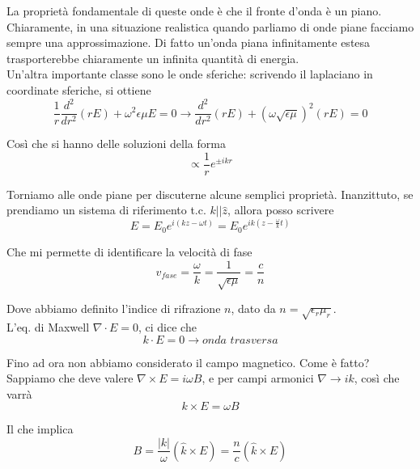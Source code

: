 \documentclass{report}
\begin{document}
La proprietà fondamentale di queste onde è che il fronte d'onda è un piano. Chiaramente, in una situazione realistica quando parliamo di onde piane facciamo sempre una approssimazione. Di fatto un'onda piana infinitamente estesa trasporterebbe chiaramente un infinita quantità di energia. \\

Un'altra importante classe sono le onde sferiche: scrivendo il laplaciano in coordinate sferiche, si ottiene 
\begin{equation}
    \frac{1}{r}\frac{d^2}{dr^2}\left(rE\right) + \omega^2\epsilon\mu E = 0 \rightarrow \frac{d^2}{dr^2}(rE) + (\omega \sqrt{\epsilon\mu})^2(rE) = 0
\end{equation}

Così che si hanno delle soluzioni della forma 
\begin{equation}
    \propto \frac{1}{r}e^{\pm ikr}
\end{equation}

Torniamo alle onde piane per discuterne alcune semplici proprietà. Inanzittuto, se prendiamo un sistema di riferimento t.c. $k || \hat{z}$, allora posso scrivere
\begin{equation}
    E = E_0 e^{i(kz - \omega t)} = E_0e^{ik\left(z- \frac{\omega}{k}t\right)}
\end{equation}

Che mi permette di identificare la velocità di fase 
\begin{equation}
    v_{fase} = \frac{\omega}{k} = \frac{1}{\sqrt{\epsilon\mu}} = \frac{c}{n}
\end{equation}

Dove abbiamo definito l'indice di rifrazione $n$, dato da $n = \sqrt{\epsilon_r \mu_r}$. \\
L'eq. di Maxwell $\nabla \cdot E = 0$, ci dice che 
\begin{equation}
    k \cdot E = 0 \rightarrow onda \, \, trasversa
\end{equation}

Fino ad ora non abbiamo considerato il campo magnetico. Come è fatto? Sappiamo che deve valere $\nabla \times E = i\omega B$, e per campi armonici $\nabla \rightarrow ik$, così che varrà
\begin{equation}
    k \times E = \omega B
\end{equation}

Il che implica
\begin{equation}
    B = \frac{|k|}{\omega}(\hat{k} \times E) = \frac{n}{c}(\hat{k} \times E)
    \end{equation}
\end{document}
